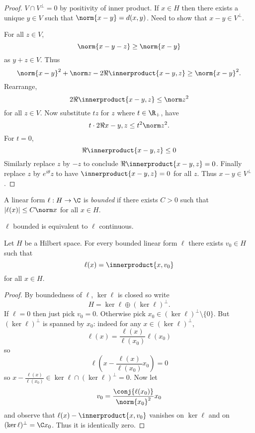 \documentclass[a4paper]{article}
\newcommand*{\ip}{\innerproduct} %
\begin{document}
\begin{proof}
  \(V \cap V^\perp = 0\) by positivity of inner product. If \(x \in H\) then there exists a unique \(y \in V\) such that \(\norm{x - y} = d(x, y)\). Need to show that \(x - y \in V^\perp\).

  For all \(z \in V\),
  \[
    \norm{x - y - z} \geq \norm{x - y}
  \]
  as \(y + z \in V\). Thus
  \[
    \norm{x - y}^2 + \norm z - 2 \Re \ip{x - y, z} \geq \norm{x - y}^2.
  \]
  Rearrange,
  \[
    2\Re \ip{x - y, z} \leq \norm z^2
  \]
  for all \(z \in V\). Now substitute \(tz\) for \(z\) where \(t \in \R_+\), have
  \[
    t \cdot 2 \Re{x - y, z} \leq t^2 \norm z^2.
  \]
  For \(t = 0\),
  \[
    \Re \ip{x - y, z} \leq 0
  \]
  Similarly replace \(z\) by \(-z\) to conclude \(\Re \ip{x - y, z} = 0\). Finally replace \(z\) by \(e^{i\theta}z\) to have \(\ip{x - y, z} = 0\) for all \(z\). Thus \(x - y \in V^\perp\).
\end{proof}

\begin{definition}
  A linear form \(\ell: H \to \C\) is \emph{bounded} if there exists \(C > 0\) such that \(|\ell(x)| \leq C\norm x\) for all \(x \in H\).
\end{definition}

\begin{remark}
  \(\ell\) bounded is equivalent to \(\ell\) continuous.
\end{remark}

\begin{theorem}
  Let \(H\) be a Hilbert space. For every bounded linear form \(\ell\) there exists \(v_0 \in H\) such that
  \[
    \ell(x) = \ip{x, v_0}
  \]
  for all \(x \in H\).
\end{theorem}

\begin{proof}
  By boundedness of \(\ell\), \(\ker \ell\) is closed so write
  \[
    H = \ker \ell \oplus (\ker \ell)^\perp.
  \]
  If \(\ell = 0\) then just pick \(v_0 = 0\). Otherwise pick \(x_0 \in (\ker \ell)^\perp \setminus \{0\}\). But \((\ker \ell)^\perp\) is spanned by \(x_0\): indeed for any \(x \in (\ker \ell)^\perp\),
  \[
    \ell(x) = \frac{\ell(x)}{\ell(x_0)} \ell(x_0)
  \]
  so
  \[
    \ell(x - \frac{\ell(x)}{\ell(x_0)} x_0) = 0
  \]
  so \(x - \frac{\ell(x)}{\ell(x_0)} \in \ker \ell \cap (\ker \ell)^\perp = 0\). Now let
  \[
    v_0 = \frac{\conj{\ell(x_0)}}{\norm{x_0}^2} x_0
  \]
  and observe that \(\ell(x) - \ip{x, v_0}\) vanishes on \(\ker \ell\) and on \((\ker \ell)^\perp = \C x_0\). Thus it is identically zero.
\end{proof}
\end{document}
